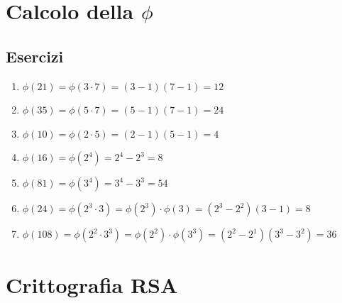 \documentclass[10pt]{article}
\begin{document}
  \section{Calcolo della $\phi$}
	\subsection{Esercizi}
		\begin{enumerate}
		\item
		$\phi(21) = \phi(3 \cdot 7) = (3-1)(7-1) = 12$
		\item
		$\phi(35) = \phi(5 \cdot 7) = (5-1)(7-1) = 24$
		\item
		$\phi(10) = \phi(2 \cdot 5) = (2-1)(5-1) = 4$
		\item
		$\phi(16) = \phi(2^4) = 2^4 - 2^3 = 8$
		\item
		$\phi(81) = \phi(3^4) = 3^4 - 3^3 = 54$
		\item
		$\phi(24) = \phi(2^3 \cdot 3) = \phi(2^3) \cdot \phi(3) = (2^3-2^2)(3-1) = 8$
		\item
		$\phi(108) = \phi(2^2 \cdot 3^3) = \phi(2^2) \cdot \phi(3^3) = (2^2-2^1)(3^3-3^2) = 36$
		\end{enumerate}
		
  \section{Crittografia RSA}
\end{document}
